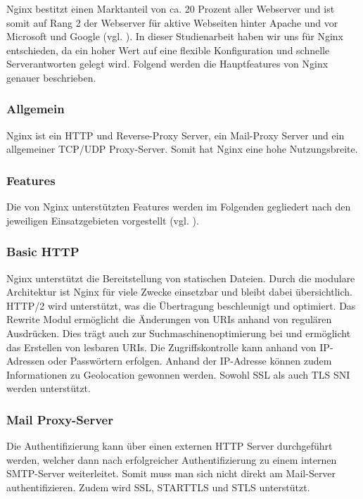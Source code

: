 Nginx bestitzt einen Marktanteil von ca. 20 Prozent aller Webserver und ist somit auf Rang 2 der Webserver für aktive Webseiten hinter Apache und vor Microsoft und Google (vgl. \cite{.k}). In dieser Studienarbeit haben wir uns für Nginx entschieden, da ein hoher Wert auf eine flexible Konfiguration und schnelle Serverantworten gelegt wird. Folgend werden die Hauptfeatures von Nginx genauer beschrieben.

\subsubsection{Allgemein}
\label{sec:NginxAllgemein}
Nginx ist ein \ac{HTTP} und Reverse-Proxy Server, ein Mail-Proxy Server und ein allgemeiner \ac{TCP}/\ac{UDP} Proxy-Server. Somit hat Nginx eine hohe Nutzungsbreite.

\subsubsection{Features}
\label{sec:NginxFeatures}
Die von Nginx unterstützten Features werden im Folgenden gegliedert nach den jeweiligen Einsatzgebieten vorgestellt (vgl. \cite{.14.03.2017}). 

\subsubsection{Basic HTTP}
\label{sec:NginxBasicHTTP}
Nginx unterstützt die Bereitstellung von statischen Dateien. Durch die modulare Architektur ist Nginx für viele Zwecke einsetzbar und bleibt dabei übersichtlich. \ac{HTTP}/2 wird unterstützt, was die Übertragung beschleunigt und optimiert. Das Rewrite Modul ermöglicht die Änderungen von \ac{URI}s anhand von regulären Ausdrücken. Dies trägt auch zur Suchmaschinenoptimierung bei und ermöglicht das Erstellen von lesbaren \ac{URI}s. Die Zugriffskontrolle kann anhand von \ac{IP}-Adressen oder Passwörtern erfolgen. Anhand der \ac{IP}-Adresse können zudem Informationen zu Geolocation gewonnen werden. Sowohl \ac{SSL} als auch \ac{TLS} \ac{SNI} werden unterstützt.

\subsubsection{Mail Proxy-Server}
\label{sec:NginxMail Proxy-Server}
Die Authentifizierung kann über einen externen \ac{HTTP} Server durchgeführt werden, welcher dann nach erfolgreicher Authentifizierung zu einem internen \ac{SMTP}-Server weiterleitet. Somit muss man sich nicht direkt am Mail-Server authentifizieren. Zudem wird \ac{SSL}, STARTTLS und STLS unterstützt.

